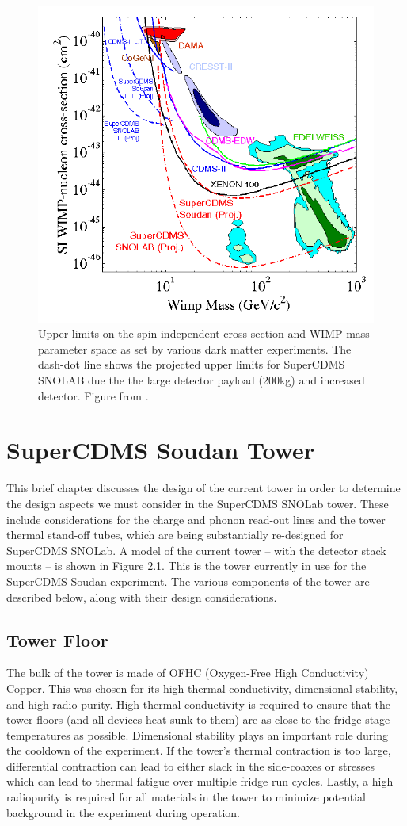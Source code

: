 \documentclass{report}
\begin{document}
\begin{figure}[h]
\centering
\includegraphics[width = .7\textwidth]{crosssection.png}
\caption{Upper limits on the spin-independent cross-section and WIMP mass parameter space as set by various dark matter experiments. The dash-dot line shows the projected upper limits for SuperCDMS SNOLAB due the the large detector payload (200kg) and increased detector. Figure from \cite{DOE}.}
\end{figure}

\chapter{SuperCDMS Soudan Tower}

This brief chapter discusses the design of the current tower in order to determine the design aspects we must consider in the SuperCDMS SNOLab tower. These include considerations for the charge and phonon read-out lines and the tower thermal stand-off tubes, which are being substantially re-designed for SuperCDMS SNOLab. A model of the current tower -- with the detector stack mounts -- is shown in Figure 2.1. This is the tower currently in use for the SuperCDMS Soudan experiment. The various components of the tower are described below, along with their design considerations.

\section{Tower Floor}
The bulk of the tower is made of OFHC (Oxygen-Free High Conductivity) Copper. This was chosen for its high thermal conductivity, dimensional stability, and high radio-purity. High thermal conductivity is required to ensure that the tower floors (and all devices heat sunk to them) are as close to the fridge stage temperatures as possible. Dimensional stability plays an important role during the cooldown of the experiment. If the tower's thermal contraction is too large, differential contraction can lead to either slack in the side-coaxes or stresses which can lead to thermal fatigue over multiple fridge run cycles. Lastly, a high radiopurity is required for all materials in the tower to minimize potential background in the experiment during operation.
\end{document}
